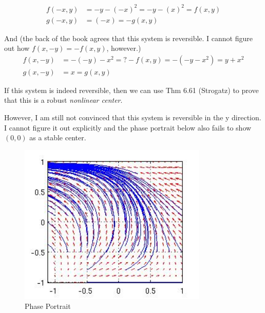 \documentclass[12pt]{article}
\newenvironment{myenv}{\begin{adjustwidth}{1cm}{}}{\end{adjustwidth}}
\begin{document}
\begin{myenv}
\begin{alignat*}{3}
f(-x,y) &= -y-(-x)^2 = -y-(x)^2 = f(x,y) \\
g(-x,y) &= (-x) = -g(x,y)
\end{alignat*}

And (the back of the book agrees that this system is reversible. I cannot figure out how $f(x,-y) = -f(x,y)$, however.)
\begin{alignat*}{3}
f(x,-y) &= - (-y) - x^2 =? -f(x,y) = -(-y-x^2) = y+x^2 \\
g(x,-y) &= x = g(x,y)
\end{alignat*}

If this system is indeed reversible, then we can use Thm 6.61 (Strogatz) to prove that this is a robust \emph{nonlinear center}.

However, I am still not convinced that this system is reversible in the y direction. I cannot figure it out explicitly and the phase portrait below also fails to show $(0,0)$ as a stable center. 


\begin{figure} [H]
    \centering
    \includegraphics[width=0.8\textwidth]{Question4_Center}
    \caption{ Phase Portrait}
    \label{figure:a0}
\end{figure}
\end{myenv}
\end{document}

